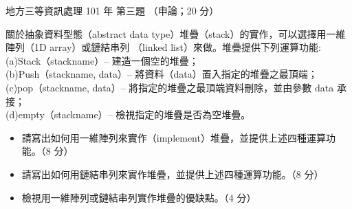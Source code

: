\begin{pastexam}[label={px:df3-101-ds-03}]{地方三等資訊處理 101 年 第三題}
（申論；20 分）

關於抽象資料型態（abstract data type）堆疊（stack）的實作，可以選擇用一維陣列（1D array）或鏈結串列
（linked list）來做。堆疊提供下列運算功能:\\
(a)Stack（stackname）-- 建造一個空的堆疊；\\
(b)Push（stackname, data）-- 將資料（data）置入指定的堆疊之最頂端；\\
(c)pop（stackname, data）-- 將指定的堆疊之最頂端資料刪除，並由參數 data 承接；\\
(d)empty（stackname）-- 檢視指定的堆疊是否為空堆疊。
\begin{itemize}[leftmargin=2.2em]
\item[㈠] 請寫出如何用一維陣列來實作（implement）堆疊，並提供上述四種運算功能。（8 分）
\item[㈡] 請寫出如何用鏈結串列來實作堆疊，並提供上述四種運算功能。（8 分）
\item[㈢] 檢視用一維陣列或鏈結串列實作堆疊的優缺點。（4 分）
\end{itemize}
\end{pastexam}

